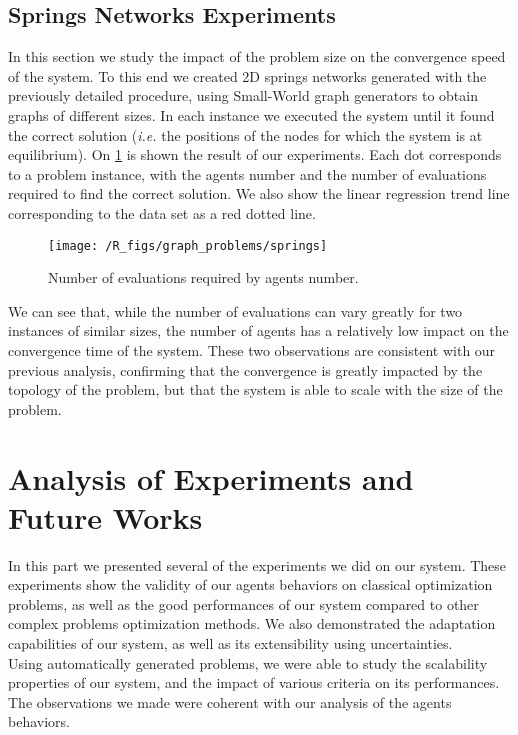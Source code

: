 \subsection{Springs Networks Experiments}

In this section we study the impact of the problem size on the convergence speed of the system. To this end we created 2D springs networks generated with the previously detailed procedure, using Small-World graph generators to obtain graphs of different sizes. In each instance we executed the system until it found the correct solution (\emph{i.e.} the positions of the nodes for which the system is at equilibrium). On \figurename{} \ref{springs_res} is shown the result of our experiments. Each dot corresponds to a problem instance, with the agents number and the number of evaluations required to find the correct solution. We also show the linear regression trend line corresponding to the data set as a red dotted line.

\begin{figure}
\centering
\texttt{[image: /R\_figs/graph\_problems/springs]}
\caption{Number of evaluations required by agents number.}\label{springs_res}
\end{figure}

We can see that, while the number of evaluations can vary greatly for two instances of similar sizes, the number of agents has a relatively low impact on the convergence time of the system. These two observations are consistent with our previous analysis, confirming that the convergence is greatly impacted by the topology of the problem, but that the system is able to scale with the size of the problem.

\newpage
\section*{Analysis of Experiments and Future Works}

In this part we presented several of the experiments we did on our system. These experiments show the validity of our agents behaviors on classical optimization problems, as well as the good performances of our system compared to other complex problems optimization methods. We also demonstrated the adaptation capabilities of our system, as well as its extensibility using uncertainties.\\
Using automatically generated problems, we were able to study the scalability properties of our system, and the impact of various criteria on its performances. The observations we made were coherent with our analysis of the agents behaviors.

